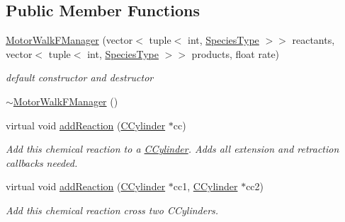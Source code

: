 \subsection*{Public Member Functions}
\begin{DoxyCompactItemize}
\item 
\hyperlink{classMotorWalkFManager_a9cd673efbc3ed580f4449e57ac5fae46}{Motor\+Walk\+F\+Manager} (vector$<$ tuple$<$ int, \hyperlink{Species_8h_a50651af47c56ea0e27235468d23542cf}{Species\+Type} $>$$>$ reactants, vector$<$ tuple$<$ int, \hyperlink{Species_8h_a50651af47c56ea0e27235468d23542cf}{Species\+Type} $>$$>$ products, float rate)
\begin{DoxyCompactList}\small\item\em default constructor and destructor \end{DoxyCompactList}\item 
\hyperlink{classMotorWalkFManager_a2a5f6d1af372cc1cff2527bd34f9eecd}{$\sim$\+Motor\+Walk\+F\+Manager} ()
\item 
virtual void \hyperlink{classMotorWalkFManager_a8974dbb104f327cf07b25415f74928db}{add\+Reaction} (\hyperlink{classCCylinder}{C\+Cylinder} $\ast$cc)
\begin{DoxyCompactList}\small\item\em Add this chemical reaction to a \hyperlink{classCCylinder}{C\+Cylinder}. Adds all extension and retraction callbacks needed. \end{DoxyCompactList}\item 
virtual void \hyperlink{classMotorWalkFManager_a7cb219c170555e7716f331e05e45aded}{add\+Reaction} (\hyperlink{classCCylinder}{C\+Cylinder} $\ast$cc1, \hyperlink{classCCylinder}{C\+Cylinder} $\ast$cc2)
\begin{DoxyCompactList}\small\item\em Add this chemical reaction cross two C\+Cylinders. \end{DoxyCompactList}\end{DoxyCompactItemize}

